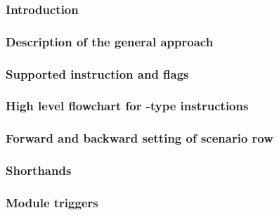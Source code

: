 % 
\subsubsection{Introduction                                              \lispNone{}}    \label{hub: instruction handling: call: intro}                                     
\subsubsection{Description of the general approach                       \lispNone{}}    \label{hub: instruction handling: call: general approach}                          
\subsubsection{Supported instruction and flags                           \lispNone{}}    \label{hub: instruction handling: call: instruction flags}                         
\subsubsection{High level flowchart for -type instructions    \lispNone{}}    \label{hub: instruction handling: call: high level flowchart}                      
\subsubsection{Forward and backward setting of scenario row              \lispDone{}}    \label{hub: instruction handling: call: scenario bedrock}                          
\subsubsection{Shorthands                                                \lispDone{}}    \label{hub: instruction handling: call: shorthands}                                
\subsubsection{Module triggers                                           \lispDone{}}    \label{hub: instruction handling: call: module triggers}                           
